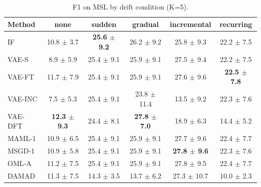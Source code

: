 \begin{table}[t]
\centering
\small
\caption{F1 on MSL by drift condition (K=5).}
\label{tab:drift_f1_msl}
\begin{tabular}{lccccc}
\toprule
Method & none & sudden & gradual & incremental & recurring \\
\midrule
IF & 10.8 $\pm$ 3.7 & \textbf{25.6 $\pm$ 9.2} & 26.2 $\pm$ 9.2 & 25.8 $\pm$ 9.3 & 22.2 $\pm$ 7.5 \\
VAE-S & 8.9 $\pm$ 5.9 & 25.4 $\pm$ 9.1 & 25.9 $\pm$ 9.1 & 27.5 $\pm$ 9.4 & 22.2 $\pm$ 7.5 \\
VAE-FT & 11.7 $\pm$ 7.9 & 25.4 $\pm$ 9.1 & 25.9 $\pm$ 9.1 & 27.6 $\pm$ 9.6 & \textbf{22.5 $\pm$ 7.8} \\
VAE-INC & 7.5 $\pm$ 5.3 & 25.4 $\pm$ 9.1 & 23.8 $\pm$ 11.4 & 13.5 $\pm$ 9.2 & 22.3 $\pm$ 7.6 \\
VAE-DFT & \textbf{12.3 $\pm$ 9.3} & 24.4 $\pm$ 8.1 & \textbf{27.8 $\pm$ 7.0} & 18.9 $\pm$ 6.3 & 14.4 $\pm$ 5.2 \\
MAML-1 & 10.9 $\pm$ 6.5 & 25.4 $\pm$ 9.1 & 25.9 $\pm$ 9.1 & 27.7 $\pm$ 9.6 & 22.4 $\pm$ 7.7 \\
MSGD-1 & 10.9 $\pm$ 5.8 & 25.4 $\pm$ 9.1 & 25.9 $\pm$ 9.1 & \textbf{27.8 $\pm$ 9.6} & 22.3 $\pm$ 7.6 \\
OML-A & 11.2 $\pm$ 7.5 & 25.4 $\pm$ 9.1 & 25.9 $\pm$ 9.1 & 27.8 $\pm$ 9.5 & 22.4 $\pm$ 7.7 \\
DAMAD & 11.3 $\pm$ 7.5 & 14.3 $\pm$ 3.5 & 13.7 $\pm$ 6.2 & 27.3 $\pm$ 10.7 & 10.0 $\pm$ 2.3 \\
\bottomrule
\end{tabular}
\end{table}

